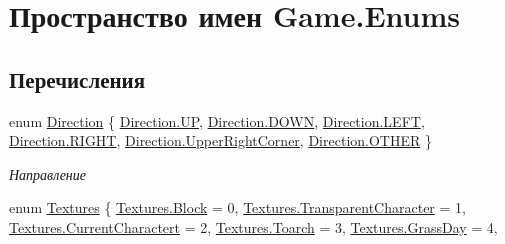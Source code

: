 \hypertarget{namespace_game_1_1_enums}{}\section{Пространство имен Game.\+Enums}
\label{namespace_game_1_1_enums}
\subsection*{Перечисления}
\begin{DoxyCompactItemize}
\item 
enum \hyperlink{namespace_game_1_1_enums_afecfa7946d85e70582de0c788cc185bd}{Direction} \{ \newline
\hyperlink{namespace_game_1_1_enums_afecfa7946d85e70582de0c788cc185bdafbaedde498cdead4f2780217646e9ba1}{Direction.\+UP}, 
\hyperlink{namespace_game_1_1_enums_afecfa7946d85e70582de0c788cc185bdac4e0e4e3118472beeb2ae75827450f1f}{Direction.\+D\+O\+WN}, 
\hyperlink{namespace_game_1_1_enums_afecfa7946d85e70582de0c788cc185bda684d325a7303f52e64011467ff5c5758}{Direction.\+L\+E\+FT}, 
\hyperlink{namespace_game_1_1_enums_afecfa7946d85e70582de0c788cc185bda21507b40c80068eda19865706fdc2403}{Direction.\+R\+I\+G\+HT}, 
\newline
\hyperlink{namespace_game_1_1_enums_afecfa7946d85e70582de0c788cc185bdafaee13016b273769adaa8e118bf510d6}{Direction.\+Upper\+Right\+Corner}, 
\hyperlink{namespace_game_1_1_enums_afecfa7946d85e70582de0c788cc185bda03570470bad94692ce93e32700d2e1cb}{Direction.\+O\+T\+H\+ER}
 \}\begin{DoxyCompactList}\small\item\em Направление \end{DoxyCompactList}
\item 
enum \hyperlink{namespace_game_1_1_enums_a2d1ea7762a7b4609383b4b578d1c4a60}{Textures} \{ \newline
\hyperlink{namespace_game_1_1_enums_a2d1ea7762a7b4609383b4b578d1c4a60ae1e4c8c9ccd9fc39c391da4bcd093fb2}{Textures.\+Block} = 0, 
\hyperlink{namespace_game_1_1_enums_a2d1ea7762a7b4609383b4b578d1c4a60aa0544b6900b52d329c015b250c112438}{Textures.\+Transparent\+Character} = 1, 
\hyperlink{namespace_game_1_1_enums_a2d1ea7762a7b4609383b4b578d1c4a60a933ae9c7efe484b7f6acde743180f10e}{Textures.\+Current\+Charactert} = 2, 
\hyperlink{namespace_game_1_1_enums_a2d1ea7762a7b4609383b4b578d1c4a60a90e78b5932e9d454180ca939b27863be}{Textures.\+Toarch} = 3, 
\newline
\hyperlink{namespace_game_1_1_enums_a2d1ea7762a7b4609383b4b578d1c4a60ad9dbe6b81249a8334f10e076154537d3}{Textures.\+Grass\+Day} = 4, 

\end{DoxyCompactItemize}
